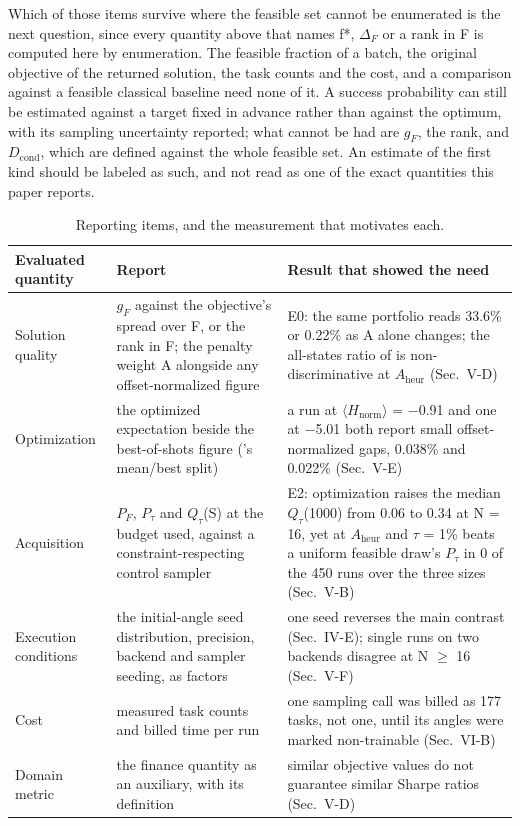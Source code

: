 \documentclass[journal]{IEEEtran}
\begin{document}
Which of those items survive where the feasible set cannot be enumerated is the next question, since every quantity above that names f*, $\Delta_{F}$ or a rank in F is computed here by enumeration. The feasible fraction of a batch, the original objective of the returned solution, the task counts and the cost, and a comparison against a feasible classical baseline need none of it. A success probability can still be estimated against a target fixed in advance rather than against the optimum, with its sampling uncertainty reported; what cannot be had are $g_{F}$, the rank, and $D_{\mathrm{cond}}$, which are defined against the whole feasible set. An estimate of the first kind should be labeled as such, and not read as one of the exact quantities this paper reports.





\begin{table}[!t]
\centering
\scriptsize
\caption{Reporting items, and the measurement that motivates each.}
\label{tab:V}
\begin{tabular}{p{}p{}p{}}
\toprule
Evaluated quantity & Report & Result that showed the need \\
\midrule
Solution quality & $g_{F}$ against the objective's spread over F, or the rank in F; the penalty weight A alongside any offset-normalized figure & E0: the same portfolio reads 33.6\% or 0.22\% as A alone changes; the all-states ratio of \cite{ref22} is non-discriminative at $A_{\mathrm{heur}}$ (Sec.~V-D) \\
Optimization & the optimized expectation beside the best-of-shots figure (\cite{ref22}'s mean/best split) & a run at $\langle$$H_{\mathrm{norm}}$$\rangle$ = $-$0.91 and one at $-$5.01 both report small offset-normalized gaps, 0.038\% and 0.022\% (Sec.~V-E) \\
Acquisition & $P_{F}$, $P_{\tau}$ and $Q_{\tau}$(S) at the budget used, against a constraint-respecting control sampler & E2: optimization raises the median $Q_{\tau}$(1000) from 0.06 to 0.34 at N = 16, yet at $A_{\mathrm{heur}}$ and $\tau$ = 1\% beats a uniform feasible draw's $P_{\tau}$ in 0 of the 450 runs over the three sizes (Sec.~V-B) \\
Execution conditions & the initial-angle seed distribution, precision, backend and sampler seeding, as factors & one seed reverses the main contrast (Sec.~IV-E); single runs on two backends disagree at N $\geq$ 16 (Sec.~V-F) \\
Cost & measured task counts and billed time per run & one sampling call was billed as 177 tasks, not one, until its angles were marked non-trainable (Sec.~VI-B) \\
Domain metric & the finance quantity as an auxiliary, with its definition & similar objective values do not guarantee similar Sharpe ratios (Sec.~V-D) \\
\bottomrule
\end{tabular}
\end{table}
\end{document}
